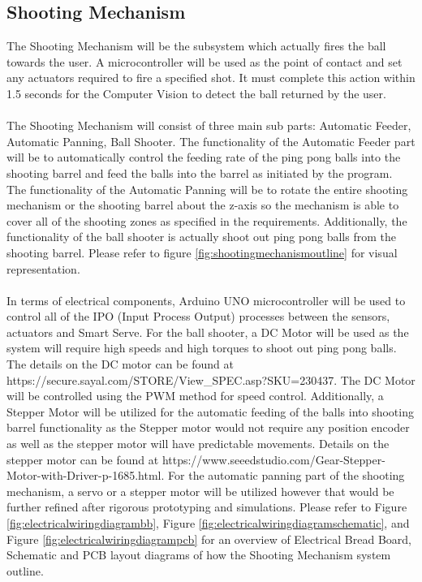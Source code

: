 \documentclass[11pt]{article}
\begin{document}
\subsection{Shooting Mechanism}
The Shooting Mechanism will be the subsystem which actually fires the ball towards the user. A microcontroller will be used as the point of contact and set any actuators required to fire a specified shot. It must complete this action within 1.5 seconds for the Computer Vision to detect the ball returned by the user. \\\\
The Shooting Mechanism will consist of three main sub parts: Automatic Feeder, Automatic Panning, Ball Shooter. The functionality of the Automatic Feeder part will be to automatically control the feeding rate of the ping pong balls into the shooting barrel and feed the balls into the barrel as initiated by the program. The functionality of the Automatic Panning will be to rotate the entire shooting mechanism or the shooting barrel about the z-axis so the mechanism is able to cover all of the shooting zones as specified in the requirements. Additionally, the functionality of the ball shooter is actually shoot out ping pong balls from the shooting barrel. Please refer to figure \ref{fig:shootingmechanismoutline} for visual representation. \\\\
In terms of electrical components, Arduino UNO microcontroller will be used to control all of the IPO (Input Process Output) processes between the sensors, actuators and Smart Serve. For the ball shooter, a DC Motor will be used as the system will require high speeds and high torques to shoot out ping pong balls. The details on the DC motor can be found at https://secure.sayal.com/STORE/View\_SPEC.asp?SKU=230437. The DC Motor will be controlled using the PWM method for speed control. Additionally, a Stepper Motor will be utilized for the automatic feeding of the balls into shooting barrel functionality as the Stepper motor would not require any position encoder as well as the stepper motor will have predictable movements. Details on the stepper motor can be found at https://www.seeedstudio.com/Gear-Stepper-Motor-with-Driver-p-1685.html. For the automatic panning part of the shooting mechanism, a servo or a stepper motor will be utilized however that would be further refined after rigorous prototyping and simulations. Please refer to Figure \ref{fig:electricalwiringdiagrambb}, Figure \ref{fig:electricalwiringdiagramschematic}, and Figure \ref{fig:electricalwiringdiagrampcb} for an overview of Electrical Bread Board, Schematic and PCB layout diagrams of how the Shooting Mechanism system outline.
\end{document}
